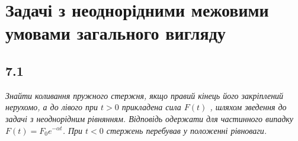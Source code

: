 \documentclass[a4paper, 14pt]{extreport}
\begin{document}
\chapter{Задачі з неоднорідними межовими умовами загального вигляду}

\section[Задача №7.1]{7.1}

\textit{Знайти коливання пружного стержня, якщо правий кінець його закріплений нерухомо, а до лівого при $t > 0$ прикладена сила $F(t)$ , шляхом зведення до задачі з неоднорідним рівнянням. Відповідь одержати для частинного випадку $F(t) = F_0 e^{-\alpha t}$. При $t < 0$ стержень перебував у положенні рівноваги.}
\end{document}
